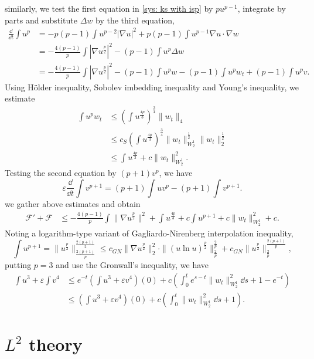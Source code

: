 similarly, we test the first equation in \eqref{sys: ks with isp} by $pu^{p-1}$, integrate by parts and substitute $\Delta w$ by the third equation,
\begin{align*}
  \frac{\dd}{\dd t}\int u^p &= -p(p-1)\int u^{p-2}|\nabla u|^2 
  + p(p-1)\int u^{p-1}\nabla u\cdot\nabla w\\
  &= -\frac{4(p-1)}{p}\int |\nabla u^{\frac{p}2}|^2 - (p-1)\int u^p\Delta w\\
  &= -\frac{4(p-1)}{p}\int |\nabla u^{\frac{p}2}|^2 
  - (p-1)\int u^p w - (p-1)\int u^pw_t + (p-1)\int u^p v.
\end{align*} 
Using H\"older inequality, Sobolev imbedding inequality and Young's inequality, we estimate
\begin{align*}
    \int u^pw_t &\leq\left(\int u^{\frac{4p}3}\right)^{\frac34}\|w_t\|_4\\
    &\leq c_S\left(\int u^{\frac{4p}3}\right)^{\frac34}\|w_t\|_{W^1_2}^{\frac12}\|w_t\|_2^{\frac12}\\
    &\leq \int u^{\frac{4p}{3}} + c\|w_t\|_{W^1_2}^2.
\end{align*}
Testing the second equation by $(p+1)v^p$, we have
\[
    \varepsilon\frac{\dd}{\dd t}\int v^{p+1} = (p+1)\int uv^p - (p+1)\int v^{p+1}.
\]
we gather above estimates and obtain 
\begin{align*}
    \mathcal{F}' + \mathcal{F} &\leq
    - \frac{4(p-1)}{p}\int\|\nabla u^{\frac{p}{2}}\|^2
    + \int u^{\frac{4p}3} + c\int u^{p+1} + c\|w_t\|_{W^1_2}^2 + c.
\end{align*} 
Noting a logarithm-type variant of Gagliardo-Nirenberg interpolation inequality,
\[
    \int u^{p+1} = \|u^{\frac{p}{2}}\|_{\frac{2(p+1)}{p}}^{\frac{2(p+1)}{2}}
    \leq c_{GN}\|\nabla u^{\frac{p}{2}}\|_2^2\cdot
    \|(u\ln u)^{\frac{p}{2}}\|_{\frac{2}{p}}^{\frac2p}
    + c_{GN}\|u^{\frac{p}{2}}\|_{\frac2p}^{\frac{2(p+1)}{p}},
\] 
putting $p=3$ and use the Gronwall's inequality, we have
\begin{align*}
    \int u^3 + \varepsilon\int v^4 &\leq
    e^{-t}(\int u^3 + \varepsilon v^4)(0)
    + c(\int_0^te^{s-t}\|w_t\|_{W^1_2}^2\dd s + 1 - e^{-t})\\
    &\leq (\int u^3 + \varepsilon v^4)(0)
    + c(\int_0^t\|w_t\|_{W^1_2}^2\dd s + 1).
\end{align*}

\section{\texorpdfstring{$L^2$}{L2} theory}
\label{sec: L2 theory}

